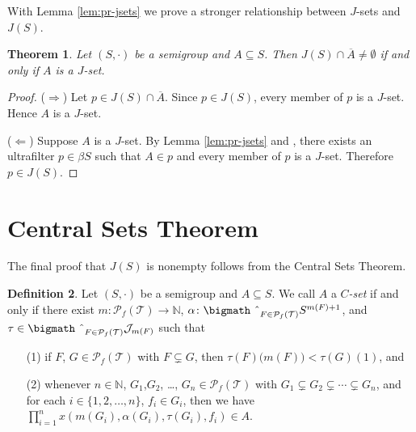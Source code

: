 \documentclass[12pt,showtrims]{memoir}
\theoremstyle{plain}
\newtheorem{thm}{Theorem}[section]
\theoremstyle{definition}
\newtheorem{defn}[thm]{Definition}
\newcommand{\bbN}{\mathbb{N}}
\newcommand{\calJ}{\mathcal{J}}
\newcommand{\calT}{\mathcal{T}}
\newcommand{\Pf}{\mathcal{P}_f}
\newcommand{\bigtimes}{\hbox{\bigmath \char'2}}
\begin{document}
With Lemma \ref{lem:pr-jsets} we prove a stronger relationship between $J$-sets and $J(S)$.

\begin{thm}
  Let $(S, \cdot)$ be a semigroup and $A \subseteq S$.
  Then $J(S) \cap \overline{A} \ne \emptyset$ if and only if $A$ is a $J$-set.
\end{thm}
\begin{proof}
  ($\Rightarrow$)
  Let $p \in J(S) \cap \overline{A}$. 
  Since $p \in J(S)$, every member of $p$ is a $J$-set.
  Hence $A$ is a $J$-set.

  ($\Leftarrow$)
  Suppose $A$ is a $J$-set. 
  By Lemma \ref{lem:pr-jsets} and \cite[Theorem 3.11]{Hindman:1998fk}, there exists an ultrafilter $p \in \beta S$ such that $A \in p$ and every member of $p$ is a $J$-set. 
  Therefore $p \in J(S)$.
\end{proof}


\section{Central Sets Theorem}
The final proof that $J(S)$ is nonempty follows from the Central Sets Theorem.
\begin{defn}
  Let $(S, \cdot)$ be a semigroup and $A \subseteq S$.
  We call $A$ a \textsl{$C$-set} if and only if there exist $m \colon \Pf(\calT) \to \bbN$, $\alpha \colon \bigtimes_{F \in \Pf(\calT)} S^{m(F)+1}$, and $\tau \in \bigtimes_{F \in \Pf(\calT)} \calJ_{m(F)}$ such that 
  \begin{itemize}
    \item[(1)] if $F$, $G \in \Pf(\calT)$ with $F \subsetneq G$, then $\tau(F)\bigl( m(F) \bigr) < \tau(G)(1)$, and
    \item[(2)] whenever $n \in \bbN$, $G_1$,$G_2$, \dots, $G_n \in \Pf(\calT)$  with $G_1 \subsetneq G_2 \subsetneq \cdots \subsetneq G_n$, and for each $i \in \{1, 2, \ldots, n\}$, $f_i \in G_i$, then we have $\prod_{i=1}^n x(m(G_i), \alpha(G_i), \tau(G_i), f_i) \in A$.
  \end{itemize}
\end{defn}
\end{document}
